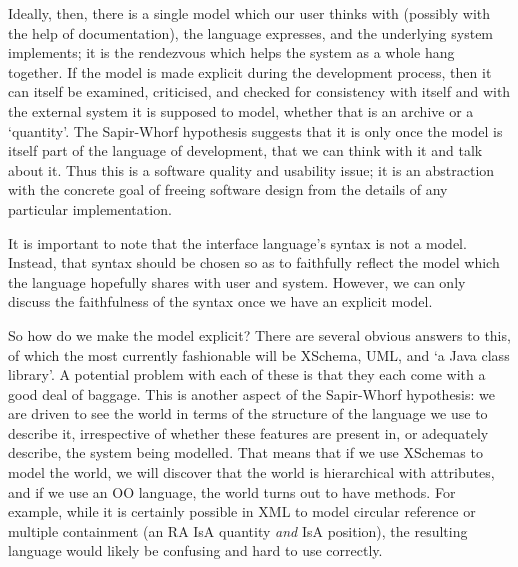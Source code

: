 \documentclass[11pt,twoside]{article}
\begin{document}
Ideally, then, there is a single model which our user thinks with
(possibly with the help of documentation), the language expresses, and
the underlying system implements; it is the rendezvous which helps the
system as a whole hang together.  If the model is made explicit during
the development process, then it can itself be examined, criticised,
and checked for consistency with itself and with the external system
it is supposed to model, whether that is an archive or a `quantity'.
The Sapir-Whorf hypothesis suggests that it is only once the model is
itself part of the language of development, that we can think with it
and talk about it.  Thus this is a software quality and usability issue; it
is an abstraction with the concrete goal of freeing software design
from the details of any particular implementation.

It is important to note that the interface language's syntax is not a
model.  Instead, that syntax should be chosen so as to faithfully
reflect the model which the language hopefully shares with user and
system.  However, we can only discuss the faithfulness of the syntax
once we have an explicit model.

So how do we make the model explicit?  There are several obvious
answers to this, of which the most currently fashionable will be
XSchema, UML, and `a Java class library'.  A potential problem with
each of these is that they each come with a good deal of baggage.
%
This is another aspect of the Sapir-Whorf hypothesis: we are driven to
see the world in terms of the structure of the language we use to
describe it, irrespective of whether these features are present in, or
adequately describe, the
system being modelled.
That means that if we use XSchemas to model the world, we will
discover that the world is hierarchical with attributes, and if we use
an OO language, the world turns out to have methods.  For example,
while it is certainly possible in XML to model circular reference or
multiple containment (an RA IsA quantity \emph{and} IsA position), the
resulting language would likely be confusing and hard to use
correctly.
%
\end{document}
